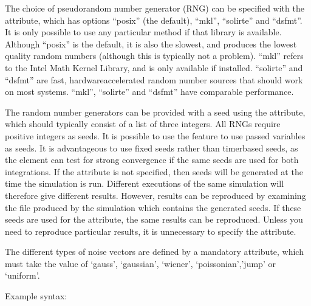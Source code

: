 \documentclass[letterpaper,10pt,english]{sphinxmanual}
\begin{document}
\sphinxAtStartPar
The choice of pseudo\sphinxhyphen{}random number generator (RNG) can be specified with the  attribute, which has options “posix” (the default), “mkl”, “solirte” and “dsfmt”.  It is only possible to use any particular method if that library is available.  Although “posix” is the default, it is also the slowest, and produces the lowest quality random numbers (although this is typically not a problem).  “mkl” refers to the Intel Math Kernel Library, and is only available if installed.  “solirte” and “dsfmt” are fast, hardware\sphinxhyphen{}accelerated random number sources that should work on most systems. “mkl”, “solirte” and “dsfmt” have comparable performance.

\sphinxAtStartPar
The random number generators can be provided with a seed using the  attribute, which should typically consist of a list of three integers.  All RNGs require positive integers as seeds.  It is possible to use the {\hyperref[\detokenize{reference_elements:validation}]{}} feature to use passed variables as seeds.  It is advantageous to use fixed seeds rather than timer\sphinxhyphen{}based seeds, as the {\hyperref[\detokenize{reference_elements:errorcheck}]{}} element can test for strong convergence if the same seeds are used for both integrations.  If the  attribute is not specified, then seeds will be generated at the time the simulation is run.  Different executions of the same simulation will therefore give different results.  However, results can be reproduced by examining the  file produced by the simulation which contains the generated seeds.  If these seeds are used for the  attribute, the same results can be reproduced.  Unless you need to reproduce particular results, it is unnecessary to specify the  attribute.

\sphinxAtStartPar
The different types of noise vectors are defined by a mandatory  attribute, which must take the value of ‘gauss’, ‘gaussian’, ‘wiener’, ‘poissonian’,’jump’ or ‘uniform’.

\sphinxAtStartPar
Example syntax:
\end{document}
